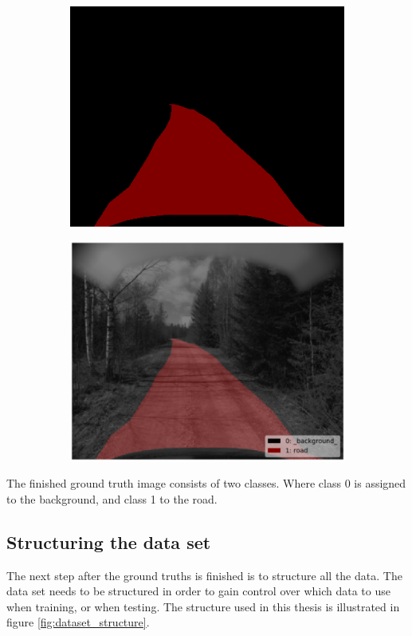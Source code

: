 \documentclass[USenglish]{ifimaster}  %
\begin{document}
\begin{figure}[ht]
\begin{subfigure}{.6\textwidth}
\includegraphics[width=.7\linewidth]{bilder/label_method.png}
\label{fig:gt_method}
\end{subfigure}
\begin{subfigure}{.6\textwidth}
\includegraphics[width=.7\linewidth]{bilder/label_viz_method.png}
\label{fig:superimposed_method}
\end{subfigure}
\end{figure}

The finished ground truth image consists of two classes. Where class 0 is assigned to the background, and class 1 to the road. 

\subsection{Structuring the data set}
The next step after the ground truths is finished is to structure all the data. The data set needs to be structured in order to gain control over which data to use when training, or when testing. The structure used in this thesis is illustrated in figure \cref{fig:dataset_structure}.
\end{document}
